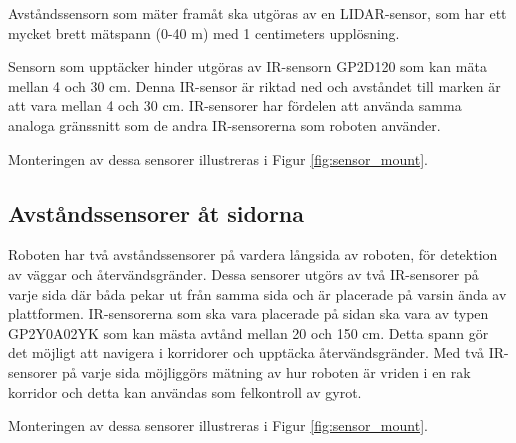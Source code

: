 \documentclass[a4paper,titlepage,12pt]{article}
\begin{document}
	Avståndssensorn som mäter framåt ska utgöras av en LIDAR-sensor, som har
    ett mycket brett mätspann (0-40 m) med 1 centimeters upplösning.

	Sensorn som upptäcker hinder utgöras av IR-sensorn GP2D120 som kan mäta 
	mellan 4 och 30 cm. Denna IR-sensor är riktad ned och avståndet till marken 
	är att vara mellan 4 och 30 cm. IR-sensorer har fördelen att använda samma 
	analoga gränssnitt som de andra IR-sensorerna som roboten använder. 

    Monteringen av dessa sensorer illustreras i Figur \ref{fig:sensor_mount}.

	\subsection{Avståndssensorer åt sidorna}
	Roboten har två avståndssensorer på vardera långsida av roboten, för
	detektion av väggar och återvändsgränder. Dessa sensorer utgörs av två 
    IR-sensorer på varje sida där båda pekar ut från samma sida och
	är placerade på varsin ända av plattformen. IR-sensorerna som ska vara placerade 
	på sidan ska vara av typen GP2Y0A02YK som kan mästa avtånd mellan 20 och 150 cm. 
	Detta spann gör det möjligt att navigera i korridorer och upptäcka 
	återvändsgränder. Med två IR-sensorer på varje sida möjliggörs mätning av hur 
	roboten är vriden i en rak korridor och detta kan användas som felkontroll av gyrot.

    Monteringen av dessa sensorer illustreras i Figur \ref{fig:sensor_mount}.
\end{document}
